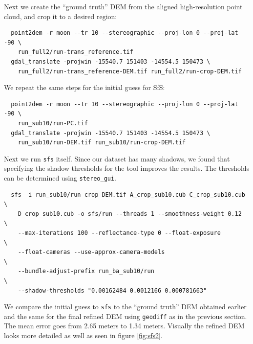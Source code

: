 Next we create the ``ground truth'' DEM from the aligned high-resolution
point cloud, and crop it to a desired region:
\begin{verbatim}
  point2dem -r moon --tr 10 --stereographic --proj-lon 0 --proj-lat -90 \
    run_full2/run-trans_reference.tif
  gdal_translate -projwin -15540.7 151403 -14554.5 150473 \
    run_full2/run-trans_reference-DEM.tif run_full2/run-crop-DEM.tif
\end{verbatim}
We repeat the same steps for the initial guess for SfS:
\begin{verbatim}
  point2dem -r moon --tr 10 --stereographic --proj-lon 0 --proj-lat -90 \
    run_sub10/run-PC.tif
  gdal_translate -projwin -15540.7 151403 -14554.5 150473 \
    run_sub10/run-DEM.tif run_sub10/run-crop-DEM.tif
\end{verbatim}
Next we run \texttt{sfs} itself. Since our dataset has many shadows, we found
that specifying the shadow thresholds for the tool improves the
results. The thresholds can be determined using \texttt{stereo\_gui}.
\begin{verbatim}
  sfs -i run_sub10/run-crop-DEM.tif A_crop_sub10.cub C_crop_sub10.cub \
    D_crop_sub10.cub -o sfs/run --threads 1 --smoothness-weight 0.12  \
    --max-iterations 100 --reflectance-type 0 --float-exposure        \
    --float-cameras --use-approx-camera-models                        \
    --bundle-adjust-prefix run_ba_sub10/run                           \
    --shadow-thresholds "0.00162484 0.0012166 0.000781663"
\end{verbatim}
We compare the initial guess to \texttt{sfs} to the ``ground truth'' DEM
obtained earlier and the same for the final refined DEM using
\texttt{geodiff} as in the previous section. The mean error goes from
2.65 meters to 1.34 meters. Visually the refined DEM looks more detailed
as well as seen in figure \ref{fig:sfs2}.


